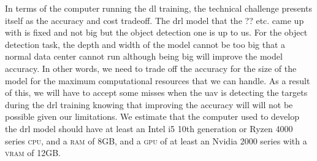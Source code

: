 \documentclass[../main.tex]{subfiles}
\begin{document}
In terms of the computer running the \gls{dl} training,
the technical challenge presents itself as 
the accuracy and cost tradeoff.
The drl model that the ?? etc. came up with 
is fixed and not big
but the object detection one is up to us.
For the object detection task, 
the depth and width of the model cannot be too big that
a normal data center cannot run although 
being big will improve
the model accuracy. In other words, we need to trade off
the accuracy for the size of the model 
for the maximum computational resources that we can handle. 
As a result of this, we will have to accept some misses
when the \gls{uav} is detecting the targets during the 
\gls{drl} training knowing that improving the accuracy will 
will not be possible given our limitations.
We estimate that the computer used to develop the \gls{drl} model
should have at least an Intel i5 10th generation or
Ryzen 4000 series \textsc{cpu}, and a \textsc{ram} of 8GB, 
and a \textsc{gpu} of at least an Nvidia 2000 series
with a \textsc{vram} of 12GB.

\end{document}
